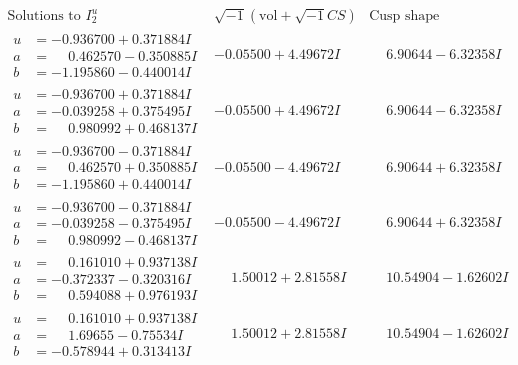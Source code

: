 \documentclass[1p]{elsarticle_modified}
\theoremstyle{definition}
\newcommand{\I}{\sqrt{-1}}
\begin{document}
$$\begin{array}{c|c|c}  
\text{Solutions to }I^u_{2}& \I (\text{vol} + \sqrt{-1}CS) & \text{Cusp shape}\\
 \hline 
\begin{aligned}
u &= -0.936700 + 0.371884 I \\
a &= \phantom{-}0.462570 - 0.350885 I \\
b &= -1.195860 - 0.440014 I\end{aligned}
 & -0.05500 + 4.49672 I & \phantom{-}6.90644 - 6.32358 I \\ \hline\begin{aligned}
u &= -0.936700 + 0.371884 I \\
a &= -0.039258 + 0.375495 I \\
b &= \phantom{-}0.980992 + 0.468137 I\end{aligned}
 & -0.05500 + 4.49672 I & \phantom{-}6.90644 - 6.32358 I \\ \hline\begin{aligned}
u &= -0.936700 - 0.371884 I \\
a &= \phantom{-}0.462570 + 0.350885 I \\
b &= -1.195860 + 0.440014 I\end{aligned}
 & -0.05500 - 4.49672 I & \phantom{-}6.90644 + 6.32358 I \\ \hline\begin{aligned}
u &= -0.936700 - 0.371884 I \\
a &= -0.039258 - 0.375495 I \\
b &= \phantom{-}0.980992 - 0.468137 I\end{aligned}
 & -0.05500 - 4.49672 I & \phantom{-}6.90644 + 6.32358 I \\ \hline\begin{aligned}
u &= \phantom{-}0.161010 + 0.937138 I \\
a &= -0.372337 - 0.320316 I \\
b &= \phantom{-}0.594088 + 0.976193 I\end{aligned}
 & \phantom{-}1.50012 + 2.81558 I & \phantom{-}10.54904 - 1.62602 I \\ \hline\begin{aligned}
u &= \phantom{-}0.161010 + 0.937138 I \\
a &= \phantom{-}1.69655 - 0.75534 I \\
b &= -0.578944 + 0.313413 I\end{aligned}
 & \phantom{-}1.50012 + 2.81558 I & \phantom{-}10.54904 - 1.62602 I \\ \hline\begin{aligned}

\end{aligned}
\end{array}$$
\end{document}
